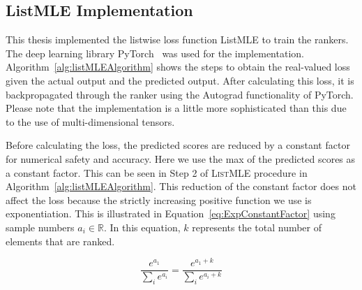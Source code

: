 \documentclass[12pt, twoside, ngerman]{report}
\begin{document}

\subsection{ListMLE Implementation}

This thesis implemented the listwise loss function ListMLE to train the rankers. The deep learning library PyTorch~\cite{PyTorch} was used for the implementation.
Algorithm~\ref{alg:listMLEAlgorithm} shows the steps to obtain the real-valued loss given the actual output and the predicted output.
After calculating this loss, it is backpropagated through the ranker using the Autograd functionality of PyTorch.
Please note that the implementation is a little more sophisticated than this due to the use of multi-dimensional tensors.

Before calculating the loss, the predicted scores are reduced by a constant factor for numerical safety and accuracy. Here we use the max of the predicted scores as a constant factor. This can be seen in Step 2 of \textsc{ListMLE} procedure in Algorithm~\ref{alg:listMLEAlgorithm}.
This reduction of the constant factor does not affect the loss because the strictly increasing positive function we use is exponentiation. This is illustrated in Equation~\ref{eq:ExpConstantFactor} using sample numbers $a_i \in  \mathbb{R}$.
In this equation, $k$ represents the total number of elements that are ranked.

\begin{equation}
\label{eq:ExpConstantFactor}
\frac{e^{a_1}}{\sum\limits_{i} e^{a_i}} = \frac{e^{a_1 + k}}{\sum\limits_{i} e^{a_i + k}} 
\end{equation}
\end{document}
